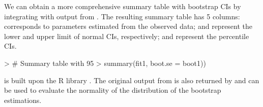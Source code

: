 We can obtain a more comprehensive summary table with bootstrap CIs by integrating  with output from . The resulting summary table has 5 columns:  corresponds to parameters estimated from the observed data;  and  represent the lower and upper limit of normal CIs, respectively;  and  represent the percentile CIs.
\begin{example}
> # Summary table with 95%
> summary(fit1, boot.se = boot1))
\end{example}
 is built upon the R library  \citep{canty2021boot}. The original output from  is also returned by  and can be used to evaluate the normality of the distribution of the bootstrap estimations.
